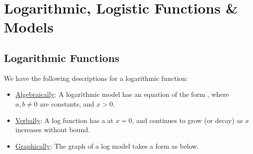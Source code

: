 \documentclass[notes]{subfiles}
\begin{document}
	\setcounter{section}{8}
	\fancyhead[LO,RE]{\bfseries \currentname}
	\fancyfoot[C]{{}}
	\fancyfoot[RO,LE]{\large \thepage}	%


\section*{Logarithmic, Logistic Functions \& Models}\label{cs1810}
	\subsection*{Logarithmic Functions}
		We have the following descriptions for a logarithmic function:
		\begin{itemize}
			\item \underline{Algebraically}: A logarithmic model has an equation of the form , where $a,b\neq 0$ are constants, and $x > 0$.
			\item \underline{Verbally}: A log function has a  at $x = 0$, and continues to grow (or decay) as $x$ increases without bound.
			\item \underline{Graphically}: The graph of a log model takes a form as below.
		\end{itemize}
\end{document}
